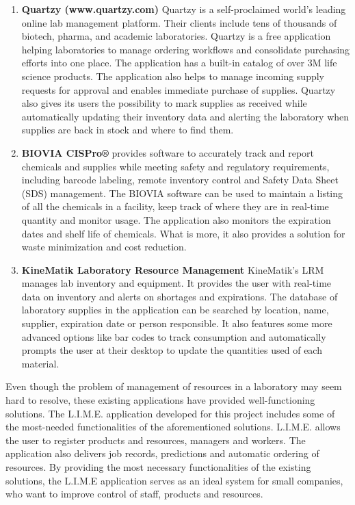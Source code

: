 \documentclass[a4paper,11pt,twoside]{report}
\theoremstyle{definition}
\begin{document}
\begin{enumerate}

\item \textbf{Quartzy (www.quartzy.com)} Quartzy is a self-proclaimed world’s leading online lab management platform. Their clients include tens of thousands of biotech, pharma, and academic laboratories. Quartzy is a free application helping laboratories to manage ordering workflows and consolidate purchasing efforts into one place. The application has a built-in catalog of over 3M life science products. The application also helps to manage incoming supply requests for approval and enables immediate purchase of supplies. Quartzy also gives its users the possibility to mark supplies as received while automatically updating their inventory data and alerting the laboratory when supplies are back in stock and where to find them. \cite{A}
\item \textbf{BIOVIA CISPro®} provides software to accurately track and report chemicals and supplies while meeting safety and regulatory requirements, including barcode labeling, remote inventory control and Safety Data Sheet (SDS) management. The BIOVIA software can be used to maintain a listing of all the chemicals in a facility, keep track of where they are in real-time quantity and monitor usage. The application also monitors the expiration dates and shelf life of chemicals. What is more, it also provides a solution for waste minimization and cost reduction. \cite{B}
\item \textbf{KineMatik Laboratory Resource Management} KineMatik’s LRM manages lab inventory and equipment. It provides the user with real-time data on inventory and alerts on shortages and expirations. The database of laboratory supplies in the application can be searched by location, name, supplier, expiration date or person responsible. It also features some more advanced options like bar codes to track consumption and automatically prompts the user at their desktop to update the quantities used of each material. \cite{C}
 
\end{enumerate}
Even though the problem of management of resources in a laboratory may seem hard to resolve, these existing applications have provided well-functioning solutions. The L.I.M.E. application developed for this project includes some of the most-needed functionalities of the aforementioned solutions. L.I.M.E. allows the user to register products and resources, managers and workers. The application also delivers job records, predictions and automatic ordering of resources. By providing the most necessary functionalities of the existing solutions, the L.I.M.E application serves as an ideal system for small companies, who want to improve control of staff, products and resources.
\end{document}
